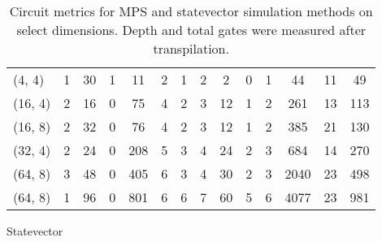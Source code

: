 \begin{table}
\begin{subtable}{\textwidth}
{\begin{tabular}{|l|c||c|c|c|c|c|c|c|c||c|c|c|c|}
          \hline
          (4, 4) &          1 &  30 &  1 &  11 & 2 & 1 &  2 &  2 &  0 &                 1 &    44 &     11 &          49 \\
         (16, 4) &          2 &  16 &  0 &  75 & 4 & 2 &  3 & 12 &  1 &                 2 &   261 &     13 &         113 \\
         (16, 8) &          2 &  32 &  0 &  76 & 4 & 2 &  3 & 12 &  1 &                 2 &   385 &     21 &         130 \\
         (32, 4) &          2 &  24 &  0 & 208 & 5 & 3 &  4 & 24 &  2 &                 3 &   684 &     14 &         270 \\
         (64, 8) &          3 &  48 &  0 & 405 & 6 & 3 &  4 & 30 &  2 &                 3 &  2040 &     23 &         498 \\
         (64, 8) &          1 &  96 &  0 & 801 & 6 & 6 &  7 & 60 &  5 &                 6 &  4077 &     23 &         981 \\
          \hline
        \end{tabular}}
      \caption{Statevector}
      \label{table:circuit_metrics_statevector_cpu}
    \end{subtable}
    \caption{Circuit metrics for MPS and statevector simulation methods on
    select dimensions. Depth and total gates were measured after transpilation.}
    \label{table:circuit_metrics}
  \end{table}
